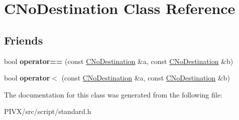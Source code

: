 \hypertarget{class_c_no_destination}{}\section{C\+No\+Destination Class Reference}
\label{class_c_no_destination}
\subsection*{Friends}
\begin{DoxyCompactItemize}
\item 
\mbox{\label{class_c_no_destination_a1b82081ed666bc8b1ba11d90122960b7}} 
bool {\bfseries operator==} (const \mbox{\hyperlink{class_c_no_destination}{C\+No\+Destination}} \&a, const \mbox{\hyperlink{class_c_no_destination}{C\+No\+Destination}} \&b)
\item 
\mbox{\label{class_c_no_destination_a0c469c10d44b10452fe9bfde8952713b}} 
bool {\bfseries operator$<$} (const \mbox{\hyperlink{class_c_no_destination}{C\+No\+Destination}} \&a, const \mbox{\hyperlink{class_c_no_destination}{C\+No\+Destination}} \&b)
\end{DoxyCompactItemize}


The documentation for this class was generated from the following file\+:\begin{DoxyCompactItemize}
\item 
P\+I\+V\+X/src/script/standard.\+h\end{DoxyCompactItemize}
